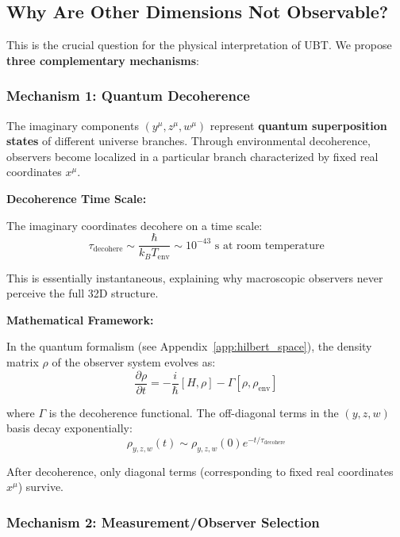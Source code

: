 \subsection{Why Are Other Dimensions Not Observable?}

This is the crucial question for the physical interpretation of UBT. We propose \textbf{three complementary mechanisms}:

\subsubsection{Mechanism 1: Quantum Decoherence}

The imaginary components $(y^{\mu}, z^{\mu}, w^{\mu})$ represent \textbf{quantum superposition states} of different universe branches. Through environmental decoherence, observers become localized in a particular branch characterized by fixed real coordinates $x^{\mu}$.

\textbf{Decoherence Time Scale:}

The imaginary coordinates decohere on a time scale:
\begin{equation}
\tau_{\text{decohere}} \sim \frac{\hbar}{k_B T_{\text{env}}} \sim 10^{-43} \text{ s at room temperature}
\end{equation}

This is essentially instantaneous, explaining why macroscopic observers never perceive the full 32D structure.

\textbf{Mathematical Framework:}

In the quantum formalism (see Appendix~\ref{app:hilbert_space}), the density matrix $\rho$ of the observer system evolves as:
\begin{equation}
\frac{\partial \rho}{\partial t} = -\frac{i}{\hbar}[H, \rho] - \Gamma[\rho, \rho_{\text{env}}]
\end{equation}

where $\Gamma$ is the decoherence functional. The off-diagonal terms in the $(y, z, w)$ basis decay exponentially:
\begin{equation}
\rho_{y,z,w}(t) \sim \rho_{y,z,w}(0) e^{-t/\tau_{\text{decohere}}}
\end{equation}

After decoherence, only diagonal terms (corresponding to fixed real coordinates $x^{\mu}$) survive.

\subsubsection{Mechanism 2: Measurement/Observer Selection}

